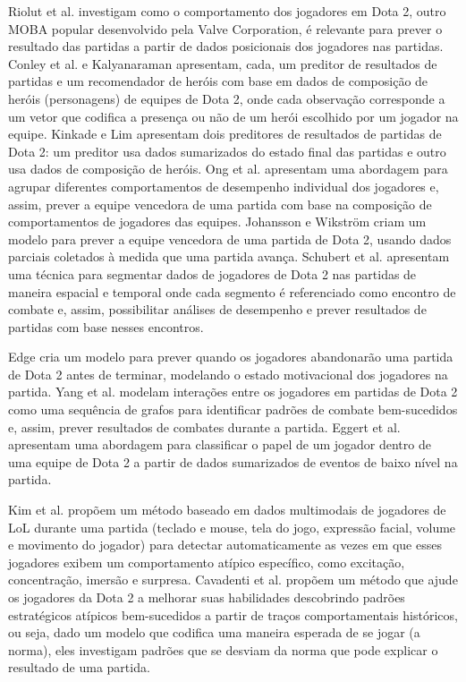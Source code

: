 Riolut et al. \cite{rioult2014mining} investigam como o comportamento dos jogadores em Dota 2, outro MOBA popular desenvolvido pela Valve Corporation, é relevante para prever o resultado das partidas a partir de dados posicionais dos jogadores nas partidas. Conley et al. \cite{conley2013does} e Kalyanaraman \cite{kalyanaraman2014win} apresentam, cada, um preditor de resultados de partidas e um recomendador de heróis com base em dados de composição de heróis (personagens) de equipes de Dota 2, onde cada observação corresponde a um vetor que codifica a presença ou não de um herói escolhido por um jogador na equipe. Kinkade e Lim \cite{kinkade2015dota} apresentam dois preditores de resultados de partidas de Dota 2: um preditor usa dados sumarizados do estado final das partidas e outro usa dados de composição de heróis. Ong et al. \cite{ong2015player} apresentam uma abordagem para agrupar diferentes comportamentos de desempenho individual dos jogadores e, assim, prever a equipe vencedora de uma partida com base na composição de comportamentos de jogadores das equipes. Johansson e Wikstr\"om \cite {johansson2015result} criam um modelo para prever a equipe vencedora de uma partida de Dota 2, usando dados parciais coletados à medida que uma partida avança. Schubert et al. \cite{schubert2016esports} apresentam uma técnica para segmentar dados de jogadores de Dota 2 nas partidas de maneira espacial e temporal onde cada segmento é referenciado como encontro de combate e, assim, possibilitar análises de desempenho e prever resultados de partidas com base nesses encontros.

Edge \cite{edge2013predicting} cria um modelo para prever quando os jogadores abandonarão uma partida de Dota 2 antes de terminar, modelando o estado motivacional dos jogadores na partida. Yang et al. \cite{yang2014identifying} modelam interações entre os jogadores em partidas de Dota 2 como uma sequência de grafos para identificar padrões de combate bem-sucedidos e, assim, prever resultados de combates durante a partida. Eggert et al. \cite{eggert2015classification} apresentam uma abordagem para classificar o papel de um jogador dentro de uma equipe de Dota 2 a partir de dados sumarizados de eventos de baixo nível na partida.

Kim et al. \cite{kim2015efficiently} propõem um método baseado em dados multimodais de jogadores de LoL durante uma partida (teclado e mouse, tela do jogo, expressão facial, volume e movimento do jogador) para detectar automaticamente as vezes em que esses jogadores exibem um comportamento atípico específico, como excitação, concentração, imersão e surpresa. Cavadenti et al. \cite{cavadenti2016did} propõem um método que ajude os jogadores da Dota 2 a melhorar suas habilidades descobrindo padrões estratégicos atípicos bem-sucedidos a partir de traços comportamentais históricos, ou seja, dado um modelo que codifica uma maneira esperada de se jogar (a norma), eles investigam padrões que se desviam da norma que pode explicar o resultado de uma partida.

